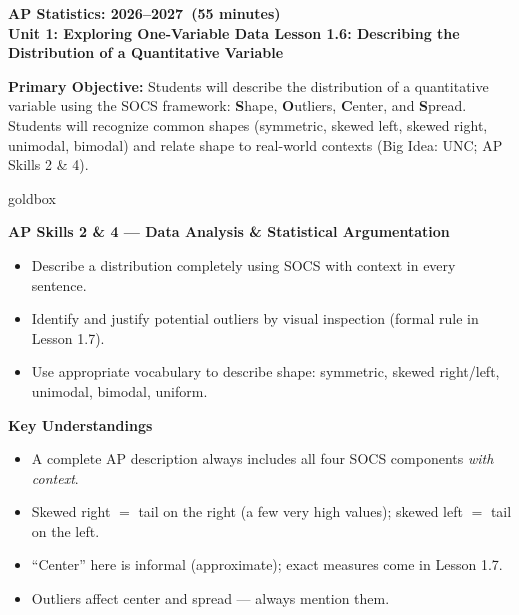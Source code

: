 \documentclass[10pt]{article}
\begin{document}
\def\CourseName{AP Statistics}
\def\SchoolYear{2026--2027}
\def\MeetingLength{55 minutes}
\def\UnitNumberName{Unit 1: Exploring One-Variable Data \quad}
\def\LessonNumberName{Lesson 1.6: Describing the Distribution of a Quantitative Variable}

\begin{center}
    {\Large\bfseries \CourseName: \SchoolYear\ (\MeetingLength) \\
    {\small\bfseries \UnitNumberName \LessonNumberName}}
\end{center}

\begin{tcolorbox}[colback=sky,colframe=navy,boxrule=0.9pt,arc=2mm,
    left=2mm,right=2mm,top=1.5mm,bottom=1.5mm]
    \textbf{Primary Objective:} Students will describe the distribution of a quantitative
    variable using the SOCS framework: \textbf{S}hape, \textbf{O}utliers, \textbf{C}enter, and
    \textbf{S}pread. Students will recognize common shapes (symmetric, skewed left, skewed right,
    unimodal, bimodal) and relate shape to real-world contexts (Big Idea: UNC; AP Skills 2 \& 4).
\end{tcolorbox}

\begin{skillbox}{goldbox}
\begin{minipage}[t]{0.48\linewidth}
    \textbf{AP Skills 2 \& 4 --- Data Analysis \& Statistical Argumentation}
    \begin{itemize}
        \item Describe a distribution completely using SOCS with context in every sentence.
        \item Identify and justify potential outliers by visual inspection (formal rule in Lesson 1.7).
        \item Use appropriate vocabulary to describe shape: symmetric, skewed right/left, unimodal, bimodal, uniform.
    \end{itemize}
\end{minipage}
\hfill
\begin{minipage}[t]{0.48\linewidth}
    \textbf{Key Understandings}
    \begin{itemize}
        \item A complete AP description always includes all four SOCS components \textit{with context}.
        \item Skewed right $=$ tail on the right (a few very high values); skewed left $=$ tail on the left.
        \item ``Center'' here is informal (approximate); exact measures come in Lesson 1.7.
        \item Outliers affect center and spread --- always mention them.
    \end{itemize}
\end{minipage}
\end{skillbox}
\end{document}
